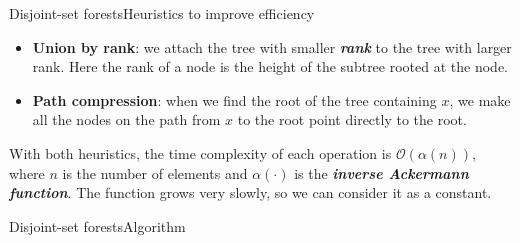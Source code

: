 \documentclass[aspectratio=169]{ctexbeamer}
\newcommand{\highlight}[1]{\textbf{\textit{#1}}}
\begin{document}
    \begin{frame}{Disjoint-set forests}{Heuristics to improve efficiency}
        \begin{itemize}
            \item {\bf Union by rank}: we attach the tree with smaller \highlight{rank} to the tree with larger rank. Here the rank of a node is the height of the subtree rooted at the node.
            \item {\bf Path compression}: when we find the root of the tree containing $x$, we make all the nodes on the path from $x$ to the root point directly to the root.
        \end{itemize}
    
        With both heuristics, the time complexity of each operation is $\mathcal O(\alpha(n))$, where $n$ is the number of elements and $\alpha(\cdot)$ is the \highlight{inverse Ackermann function}. The function grows very slowly, so we can consider it as a constant.
    \end{frame}

    \begin{frame}{Disjoint-set forests}{Algorithm}
        \small
        \begin{algorithm}[H]
            \caption{Disjoint-set forests}
    
            \BlankLine
    
    
            \BlankLine


        \end{algorithm}
    \end{frame}
\end{document}
